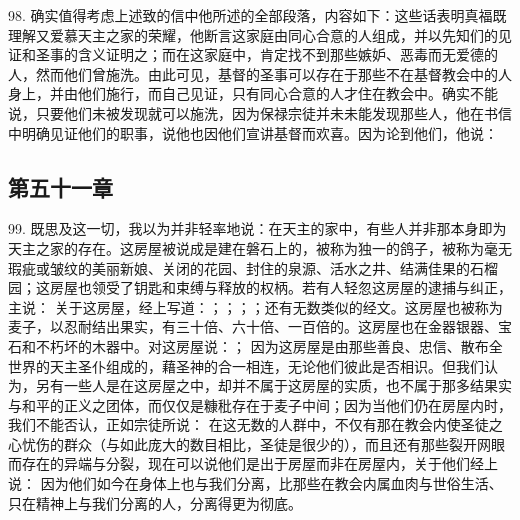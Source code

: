 98. 确实值得考虑上述致的信中他所述的全部段落，内容如下：这些话表明真福既理解又爱慕天主之家的荣耀，他断言这家庭由同心合意的人组成，并以先知们的见证和圣事的含义证明之；而在这家庭中，肯定找不到那些嫉妒、恶毒而无爱德的人，然而他们曾施洗。由此可见，基督的圣事可以存在于那些不在基督教会中的人身上，并由他们施行，而自己见证，只有同心合意的人才住在教会中。确实不能说，只要他们未被发现就可以施洗，因为保禄宗徒并未未能发现那些人，他在书信中明确见证他们的职事，说他也因他们宣讲基督而欢喜。因为论到他们，他说： \par


\subsection{第五十一章}

99. 既思及这一切，我以为并非轻率地说：在天主的家中，有些人并非那本身即为天主之家的存在。这房屋被说成是建在磐石上的，被称为独一的鸽子，被称为毫无瑕疵或皱纹的美丽新娘、关闭的花园、封住的泉源、活水之井、结满佳果的石榴园；这房屋也领受了钥匙和束缚与释放的权柄。若有人轻忽这房屋的逮捕与纠正，主说： 关于这房屋，经上写道：；；；；还有无数类似的经文。这房屋也被称为麦子，以忍耐结出果实，有三十倍、六十倍、一百倍的。这房屋也在金器银器、宝石和不朽坏的木器中。对这房屋说：； 因为这房屋是由那些善良、忠信、散布全世界的天主圣仆组成的，藉圣神的合一相连，无论他们彼此是否相识。但我们认为，另有一些人是在这房屋之中，却并不属于这房屋的实质，也不属于那多结果实与和平的正义之团体，而仅仅是糠秕存在于麦子中间；因为当他们仍在房屋内时，我们不能否认，正如宗徒所说： 在这无数的人群中，不仅有那在教会内使圣徒之心忧伤的群众（与如此庞大的数目相比，圣徒是很少的），而且还有那些裂开网眼而存在的异端与分裂，现在可以说他们是出于房屋而非在房屋内，关于他们经上说： 因为他们如今在身体上也与我们分离，比那些在教会内属血肉与世俗生活、只在精神上与我们分离的人，分离得更为彻底。\par

